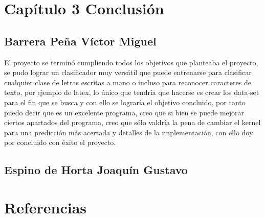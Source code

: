 \documentclass[
  spanish,
]{article}
\begin{document}
\hypertarget{capuxedtulo-3-conclusiuxf3n}{%
\section{Capítulo 3 Conclusión}\label{capuxedtulo-3-conclusiuxf3n}}

\hypertarget{barrera-peuxf1a-vuxedctor-miguel}{%
\subsection{Barrera Peña Víctor
Miguel}\label{barrera-peuxf1a-vuxedctor-miguel}}

El proyecto se terminó cumpliendo todos los objetivos que planteaba el
proyecto, se pudo lograr un clasificador muy versátil que puede
entrenarse para clasificar cualquier clase de letras escritas a mano o
incluso para reconocer caracteres de texto, por ejemplo de latex, lo
único que tendría que hacerse es crear los data-set para el fin que se
busca y con ello se lograría el objetivo concluido, por tanto puedo
decir que es un excelente programa, creo que si bien se puede mejorar
ciertos apartados del programa, creo que sólo valdría la pena de cambiar
el kernel para una predicción más acertada y detalles de la
implementación, con ello doy por concluido con éxito el proyecto.

\hypertarget{espino-de-horta-joaquuxedn-gustavo}{%
\subsection{Espino de Horta Joaquín
Gustavo}\label{espino-de-horta-joaquuxedn-gustavo}}

\hypertarget{referencias}{%
\section{Referencias}\label{referencias}}
\end{document}
